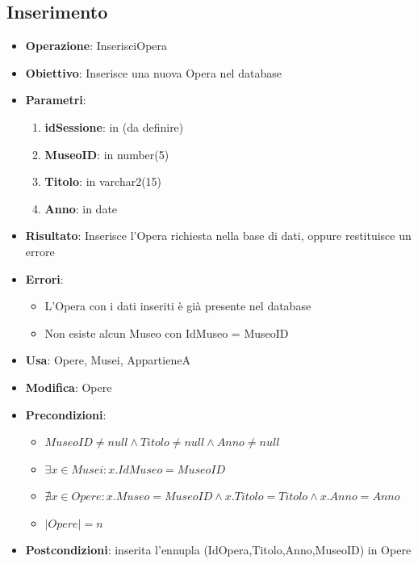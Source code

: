 \documentclass[a4paper,11pt]{article}
\begin{document}
\subsection{Inserimento}
\begin{itemize}
	\item \textbf{Operazione}: InserisciOpera
	\item \textbf{Obiettivo}: Inserisce una nuova Opera nel database
	\item \textbf{Parametri}:
	\begin{enumerate}
		\item \textbf{idSessione}: in (da definire)
		\item \textbf{MuseoID}: in number(5)
		\item \textbf{Titolo}: in varchar2(15)
		\item \textbf{Anno}: in date
	\end{enumerate}
	\item \textbf{Risultato}: Inserisce l'Opera richiesta nella base di dati, oppure restituisce un errore
	\item \textbf{Errori}: 
	\begin{itemize}
		\item L'Opera con i dati inseriti è già presente nel database
		\item Non esiste alcun Museo con IdMuseo = MuseoID
	\end{itemize}
	\item \textbf{Usa}: Opere, Musei, AppartieneA
	\item \textbf{Modifica}: Opere
	\item \textbf{Precondizioni}:
	\begin{itemize}
		\item $MuseoID \ne null \land Titolo \ne null \land Anno \ne null$
		\item $\exists x \in Musei : x.IdMuseo = MuseoID$
		\item $\nexists x \in Opere : x.Museo = MuseoID \land x.Titolo = Titolo \land x.Anno = Anno$
		\item $|Opere| = n$
	\end{itemize}
	\item \textbf{Postcondizioni}: inserita l'ennupla (IdOpera,Titolo,Anno,MuseoID) in Opere
\end{itemize}

\end{document}
